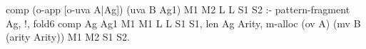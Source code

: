   comp (o-app [o-uva A|Ag]) (uva B Ag1) M1 M2 L L S1 S2 :-
    pattern-fragment Ag, !,
      fold6 comp Ag Ag1 M1 M1 L L S1 S1,
      len Ag Arity, 
      m-alloc (ov A) (mv B (arity Arity)) M1 M2 S1 S2.
